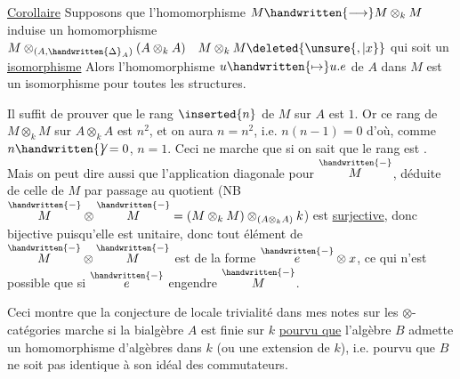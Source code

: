 
\uline{Corollaire} Supposons que l'homomorphisme $M\handwritten{\longrightarrow}M\otimes_{k}M$ induise un homomorphisme $M\otimes_{(A,\handwritten{\Delta}_{A})}(A\otimes_{k}A)\quad M\otimes_{k}M\deleted{\unsure{,|x}}$  qui soit un \uline{isomorphisme} Alors l'homomorphisme $u\handwritten{\mapsto}u.e$ de $A$ dans $M$ est un isomorphisme pour toutes les structures.

Il suffit de prouver que le rang $\inserted{n}$ de $M$ sur $A$ est $1$. Or ce rang de $M\otimes_{k}M$ sur $A\otimes_{k}A$ est $n^{2}$, et on aura $n=n^{2}$, i.e. $n(n-1)=0$ d'où, comme $n\handwritten{\not}=0$, $n=1$. Ceci ne marche que si on sait que le rang est . Mais on peut dire aussi que l'application diagonale pour $\overset{\handwritten{-}}{M}$, déduite de celle de $M$ par passage au quotient (NB $\overset{\handwritten{-}}{M}\otimes\overset{\handwritten{-}}{M}=(M\otimes_{k}M)\otimes_{(A\otimes_{k}A)}k$) est \uline{surjective}, donc bijective puisqu'elle est unitaire, donc tout élément de $\overset{\handwritten{-}}{M}\otimes\overset{\handwritten{-}}{M}$ est de la forme $\overset{\handwritten{-}}{e}\otimes x$, ce qui n'est possible que si $\overset{\handwritten{-}}{e}$ engendre $\overset{\handwritten{-}}{M}$.

Ceci montre que la conjecture de locale trivialité  dans mes notes sur les $\otimes$-catégories marche si la bialgèbre $A$  est finie sur $k$ \uline{pourvu que} l'algèbre $B$ admette un homomorphisme d'algèbres dans $k$ (ou une extension de $k$), i.e. pourvu que $B$ ne soit pas identique à son idéal des commutateurs.
